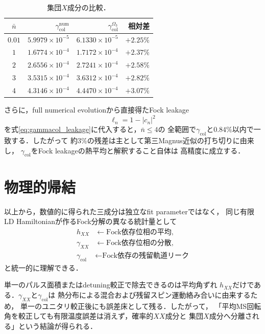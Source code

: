 \documentclass[dvipdfmx,a4paper,10pt]{jsarticle}
\begin{document}
\begin{table}[htbp]
 \centering
 \small
 \caption{集団$X$成分の比較．}
 \label{tab:collective_comparison}
 \setlength{\tabcolsep}{8pt}
 \begin{tabular}{crrr}
  \toprule
  $\bar n$
  & $\gamma_{\mathrm{col}}^{\mathrm{num}}$
  & $\gamma_{\mathrm{col}}^{\Omega_3}$
  & 相対差\\
  \midrule
  $0.01$ & $5.9979{\times}10^{-5}$ & $6.1330{\times}10^{-5}$ & $+2.25\%$\\
  $1$    & $1.6774{\times}10^{-4}$ & $1.7172{\times}10^{-4}$ & $+2.37\%$\\
  $2$    & $2.6556{\times}10^{-4}$ & $2.7241{\times}10^{-4}$ & $+2.58\%$\\
  $3$    & $3.5315{\times}10^{-4}$ & $3.6312{\times}10^{-4}$ & $+2.82\%$\\
  $4$    & $4.3146{\times}10^{-4}$ & $4.4470{\times}10^{-4}$ & $+3.07\%$\\
  \bottomrule
 \end{tabular}
\end{table}

さらに，full numerical evolutionから直接得たFock leakage
\begin{equation}
 \ell_n=1-|c_n|^2
\end{equation}
を式\eqref{eq:gammacol_leakage}に代入すると，$\bar n\leq4$の
全範囲で$\gamma_{\mathrm{col}}$と$0.84\%$以内で一致する．したがって
約$3\%$の残差は主として第三Magnus近似の打ち切りに由来し，
$\gamma_{\mathrm{col}}$をFock leakageの熱平均と解釈すること自体は
高精度に成立する．

\section{物理的帰結}

以上から，数値的に得られた三成分は独立なfit parameterではなく，
同じ有限LD Hamiltonianが作るFock分解の異なる統計量として
\begin{equation}
 \boxed{
 \begin{aligned}
  h_{XX}
  &\longleftarrow
  \text{Fock依存位相の平均},\\
  \gamma_{XX}
  &\longleftarrow
  \text{Fock依存位相の分散},\\
  \gamma_{\mathrm{col}}
  &\longleftarrow
  \text{Fock依存の残留軌道リーク}
 \end{aligned}
 }
 \label{eq:unified_picture}
\end{equation}
と統一的に理解できる．

単一のパルス面積またはdetuning較正で除去できるのは平均角ずれ
$h_{XX}$だけである．$\gamma_{XX}$と$\gamma_{\mathrm{col}}$は
熱分布による混合および残留スピン運動絡み合いに由来するため，
単一のユニタリ較正後にも誤差床として残る．したがって，
「平均MS回転角を較正しても有限温度誤差は消えず，確率的$XX$成分と
集団$X$成分へ分離される」という結論が得られる．
\end{document}
